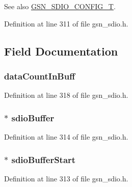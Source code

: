 \begin{DoxySeeAlso}{See also}
\hyperlink{a00653_ga741fda4dc2cd93143a8a73ddaace7de8}{GSN\_\-SDIO\_\-CONFIG\_\-T}. 
\end{DoxySeeAlso}


Definition at line 311 of file gsn\_\-sdio.h.



\subsection{Field Documentation}
\hypertarget{a00225_a9e319c58ece6fc0adc5037cea451b24e}{
\subsubsection[{dataCountInBuff}]{ {\bf dataCountInBuff}}}
\label{a00225_a9e319c58ece6fc0adc5037cea451b24e}


Definition at line 318 of file gsn\_\-sdio.h.

\hypertarget{a00225_ad5497d2144c1e9439da107c0b98903e3}{
\subsubsection[{sdioBuffer}]{$\ast$ {\bf sdioBuffer}}}
\label{a00225_ad5497d2144c1e9439da107c0b98903e3}


Definition at line 314 of file gsn\_\-sdio.h.

\hypertarget{a00225_a449e4955b6dc1e05ba6b00e90ba4221b}{
\subsubsection[{sdioBufferStart}]{$\ast$ {\bf sdioBufferStart}}}
\label{a00225_a449e4955b6dc1e05ba6b00e90ba4221b}


Definition at line 313 of file gsn\_\-sdio.h.

